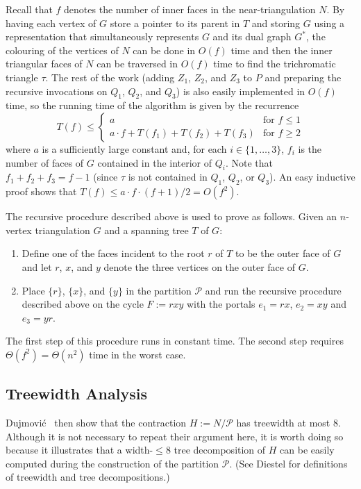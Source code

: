 \documentclass[kpfonts]{patmorin}
\let\le\leqslant
\let\ge\geqslant
\begin{document}
Recall that $f$ denotes the number of inner faces in the near-triangulation $N$.  By having each vertex of $G$ store a pointer to its parent in $T$ and storing $G$ using a representation that simultaneously represents $G$ and its dual graph $G^*$, the colouring of the vertices of $N$ can be done in $O(f)$ time and then the inner triangular faces of $N$ can be traversed in $O(f)$ time to find the trichromatic triangle $\tau$. The rest of the work (adding $Z_1$, $Z_2$, and $Z_3$ to $P$ and preparing the recursive invocations on $Q_1$, $Q_2$, and $Q_3$) is also easily implemented in $O(f)$ time, so the running time of the algorithm is given by the recurrence
\[  T(f) \le \begin{cases}
           a & \text{for $f\le 1$} \\
           a\cdot f + T(f_1)+T(f_2)+T(f_3) & \text{for $f\ge 2$}
         \end{cases}
 \]
where $a$ is a sufficiently large constant and, for each $i\in\{1,\ldots,3\}$, $f_i$ is the number of faces of $G$ contained in the interior of $Q_i$.
Note that $f_1+f_2+f_3=f-1$ (since $\tau$ is not contained in $Q_1$, $Q_2$, or $Q_3$).  An easy inductive proof shows that $T(f) \le a\cdot f\cdot (f+1)/2 = O(f^2)$.

The recursive procedure described above is used to prove  as follows.  Given an $n$-vertex triangulation $G$ and a spanning tree $T$ of $G$:
\begin{enumerate}
  \item Define one of the faces incident to the root $r$ of $T$ to be the outer face of $G$ and let $r$, $x$, and $y$ denote the three vertices on the outer face of $G$.
  \item Place $\{r\}$, $\{x\}$, and $\{y\}$ in the partition $\mathcal{P}$ and run the recursive procedure described above on the cycle $F:=rxy$ with the portals $e_1=rx$, $e_2=xy$ and $e_3=yr$.
\end{enumerate}
The first step of this procedure runs in constant time.  The second step requires $\Theta(f^2)=\Theta(n^2)$ time in the worst case.


\subsection{Treewidth Analysis}

Dujmović \etal\ then show that the contraction $H:=N/\mathcal{P}$ has treewidth at most 8.  Although it is not necessary to repeat their argument here, it is worth doing so because it illustrates that a width-$\le\!8$ tree decomposition of $H$ can be easily computed during the construction of the partition $\mathcal{P}$.  (See Diestel \cite[Chapter 12]{diestel:graph} for definitions of treewidth and tree decompositions.)
\end{document}
